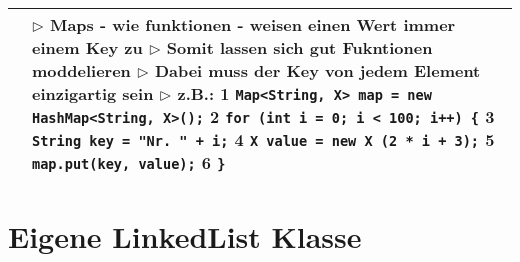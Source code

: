 \begin{table}[H]
\begin{tabular}{ | p{4cm} p{13.5cm} | }
	\makecell[l]{Maps} & 
	\makecell[l]
	{
	$\rhd$ Maps - wie funktionen - weisen einen Wert immer einem Key zu \\
	$\rhd$ Somit lassen sich gut Fukntionen moddelieren \\
	$\rhd$ Dabei muss der Key von jedem Element einzigartig sein \\
	$\rhd$ z.B.: \\
	\hspace{0.5cm}  1 \hspace{0.4cm} \texttt{Map<String, X> map = new HashMap<String, X>();} \\
	\hspace{0.5cm}  2 \hspace{0.4cm} \texttt{for (int i = 0; i < 100; i++) \{} \\
	\hspace{0.5cm}  3 \hspace{0.6cm} \texttt{String key = "Nr. " + i;} \\
	\hspace{0.5cm}  4 \hspace{0.6cm} \texttt{X value = new X (2 * i + 3);} \\
	\hspace{0.5cm}  5 \hspace{0.6cm} \texttt{map.put(key, value);} \\
	\hspace{0.5cm}  6 \hspace{0.4cm} \texttt{\}} \\
	} 	\\ \hline


	\end{tabular}
	\end{table}



\section{Eigene LinkedList Klasse}


